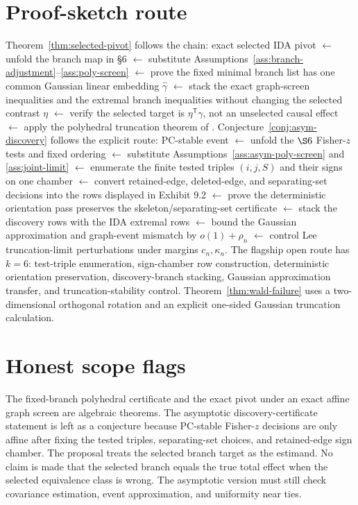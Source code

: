 \documentclass[11pt]{article}
\newcommand{\transpose}{\mathsf{T}}
\theoremstyle{definition}
\theoremstyle{plain}
\theoremstyle{remark}
\begin{document}
\section{Proof-sketch route}
Theorem~\ref{thm:selected-pivot} follows the chain: exact selected IDA pivot \(\leftarrow\) unfold the branch map in \S6 \(\leftarrow\) substitute Assumptions~\ref{ass:branch-adjustment}--\ref{ass:poly-screen} \(\leftarrow\) prove the fixed minimal branch list has one common Gaussian linear embedding \(\hat\gamma\) \(\leftarrow\) stack the exact graph-screen inequalities and the extremal branch inequalities without changing the selected contrast \(\eta\) \(\leftarrow\) verify the selected target is \(\eta^\transpose\gamma\), not an unselected causal effect \(\leftarrow\) apply the polyhedral truncation theorem of \citet{LeeSunSunTaylor2016Polyhedral}\). Conjecture~\ref{conj:asym-discovery} follows the explicit route: PC-stable event \(\leftarrow\) unfold the \(\S6\) Fisher-\(z\) tests and fixed ordering \(\leftarrow\) substitute Assumptions~\ref{ass:asym-poly-screen} and \ref{ass:joint-limit} \(\leftarrow\) enumerate the finite tested triples \((i,j,S)\) and their signs on one chamber \(\leftarrow\) convert retained-edge, deleted-edge, and separating-set decisions into the rows displayed in Exhibit 9.2 \(\leftarrow\) prove the deterministic orientation pass preserves the skeleton/separating-set certificate \(\leftarrow\) stack the discovery rows with the IDA extremal rows \(\leftarrow\) bound the Gaussian approximation and graph-event mismatch by \(o(1)+\rho_n\) \(\leftarrow\) control Lee truncation-limit perturbations under margins \(c_n,\kappa_n\). The flagship open route has \(k=6\): test-triple enumeration, sign-chamber row construction, deterministic orientation preservation, discovery-branch stacking, Gaussian approximation transfer, and truncation-stability control. Theorem~\ref{thm:wald-failure} uses a two-dimensional orthogonal rotation and an explicit one-sided Gaussian truncation calculation.

\section{Honest scope flags}
The fixed-branch polyhedral certificate and the exact pivot under an exact affine graph screen are algebraic theorems. The asymptotic discovery-certificate statement is left as a conjecture because PC-stable Fisher-\(z\) decisions are only affine after fixing the tested triples, separating-set choices, and retained-edge sign chamber. The proposal treats the selected branch target as the estimand. No claim is made that the selected branch equals the true total effect when the selected equivalence class is wrong. The asymptotic version must still check covariance estimation, event approximation, and uniformity near ties.
\end{document}
